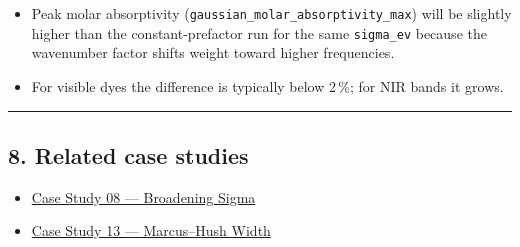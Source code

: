 \documentclass[
  11pt,
]{article}
\providecommand{\tightlist}{
  \setlength{\itemsep}{0pt}\setlength{\parskip}{0pt}}
\begin{document}
\begin{itemize}
\tightlist
\item
  Peak molar absorptivity (\texttt{gaussian\_molar\_absorptivity\_max})
  will be slightly higher than the constant-prefactor run for the same
  \texttt{sigma\_ev} because the wavenumber factor shifts weight toward
  higher frequencies.
\item
  For visible dyes the difference is typically below 2\,\%; for NIR bands
  it grows.
\end{itemize}

\begin{center}\rule{0.5\linewidth}{0.5pt}\end{center}

\hypertarget{8-related-case-studies}{
\subsection{8. Related case studies}\label{8-related-case-studies}}

\begin{itemize}
\tightlist
\item
  \href{https://github.com/pinarsyt/overlap-calculator/blob/main/case_studies/08_broadening_sigma/README.md}{Case
  Study 08 --- Broadening Sigma}
\item
  \href{https://github.com/pinarsyt/overlap-calculator/blob/main/case_studies/13_marcus_hush_width/README.md}{Case
  Study 13 --- Marcus--Hush Width}
\end{itemize}
\end{document}
